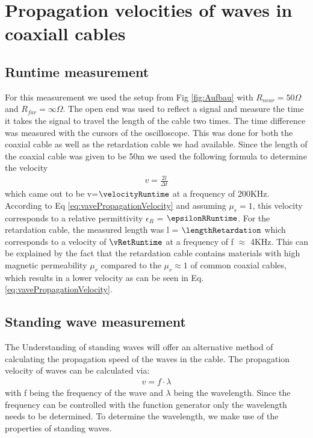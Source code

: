 \documentclass[a4paper,10pt,twocolumn]{article}
\begin{document}
    \section{Propagation velocities of waves in coaxiall cables}
    \subsection{Runtime measurement}
    \label{subsec:runtimeMeasurement}
    For this measurement we used the setup from Fig \ref{fig:Aufbau} with $R_{near}=50\Omega$ and $R_{far}=\infty \Omega $.
    The open end was used to reflect a signal and measure the time it takes the signal to travel the length of the cable two times.
    The time difference was measured with the cursors of the oscilloscope.
    This was done for both the coaxial cable as well as the retardation cable we had available.
    Since the length of the  coaxial cable was given to be 50m we used the following formula to determine the velocity
    \begin{align}
        \label{eq:runtimeVelocity}
        v=\frac{2l}{\Delta t}
        \end{align}
    which came out to be v=$\velocityRuntime$ at a frequency of 200KHz.
    According to Eq \ref{eq:vavePropagationVelocity} and assuming $\mu_r = 1$, this velocity corresponds to a relative permittivity $\epsilon_R$ = $\epsilonRRuntime$.
    \endline
    For the retardation cable, the measured length was l = $\lengthRetardation$ which corresponds to a velocity of $\vRetRuntime$ at a frequency of f $\approx$ 4KHz.
    This can be explained by the fact that the retardation cable contains materials with high magnetic permeability $\mu_r$ compared to the $\mu_r \approx 1 $ of common coaxial cables, which results in a lower velocity as can be seen in Eq. \ref{eq:vavePropagationVelocity}.
    \subsection{Standing wave measurement}
    \label{subsec:standingWaveMeasurement}
    The Understanding of standing waves will offer an alternative method of  calculating the propagation speed of the waves in the cable.
    The propagation velocity of waves can be calculated via:
    \begin{align}
        \label{eq:velocityStanding}
        v = f\cdot\lambda
        \end{align}
    with f being the frequency of the wave and $\lambda$ being the wavelength.
    Since the frequency can be controlled with the function generator only the wavelength needs to be determined.
    To determine the wavelength, we make use of the properties of standing waves. 
\end{document}
